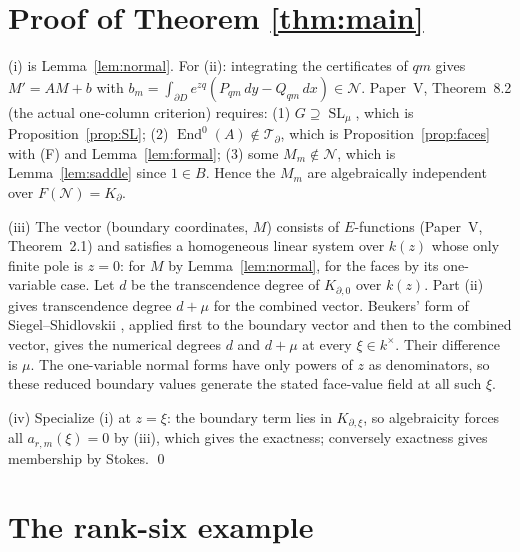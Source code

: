 \documentclass[11pt]{article}
\numberwithin{equation}{section}
\theoremstyle{definition}
\theoremstyle{remark}
\newcommand{\SL}{\operatorname{SL}}\newcommand{\GL}{\operatorname{GL}}\newcommand{\PGL}{\operatorname{PGL}}
\newcommand{\End}{\operatorname{End}}\newcommand{\Hom}{\operatorname{Hom}}\newcommand{\Span}{\operatorname{span}}
\newcommand{\Ncal}{\mathcal N}\newcommand{\Tcal}{\mathcal T}\newcommand{\Bcal}{\mathcal B}
\begin{document}
\section{Proof of Theorem \ref{thm:main}}

(i) is Lemma~\ref{lem:normal}. For (ii): integrating the certificates of
$qm$ gives $M'=AM+b$ with $b_m=\int_{\partial D}e^{zq}(P_{qm}\,dy-Q_{qm}\,dx)\in\Ncal$.
Paper~V, Theorem~8.2 (the actual one-column criterion) requires:
(1) $G\supseteq\SL_\mu$, which is Proposition~\ref{prop:SL};
(2) $\End^0(A)\notin\Tcal_\partial$, which is Proposition~\ref{prop:faces}
with (F) and Lemma~\ref{lem:formal};
(3) some $M_m\notin\Ncal$, which is Lemma~\ref{lem:saddle} since $1\in B$.
Hence the $M_m$ are algebraically independent over $F(\Ncal)=K_\partial$.

(iii) The vector (boundary coordinates, $M$) consists of $E$-functions
(Paper~V, Theorem~2.1) and satisfies a homogeneous linear system over $k(z)$
whose only finite pole is $z=0$: for $M$ by Lemma~\ref{lem:normal}, for the
faces by its one-variable case. Let $d$ be the transcendence degree of
$K_{\partial,0}$ over $k(z)$. Part (ii) gives transcendence degree $d+\mu$
for the combined vector. Beukers' form of Siegel--Shidlovskii
\cite[Theorem~1.1, p.~370]{Beukers}, applied first to the boundary vector
and then to the combined vector, gives the numerical degrees $d$ and
$d+\mu$ at every $\xi\in k^\times$. Their difference is $\mu$.
The one-variable normal forms have only powers of $z$ as denominators, so
these reduced boundary values generate the stated face-value field at
all such $\xi$.

(iv) Specialize (i) at $z=\xi$: the boundary term lies in $K_{\partial,\xi}$,
so algebraicity forces all $a_{r,m}(\xi)=0$ by (iii), which gives the exactness;
conversely exactness gives membership by Stokes. \qed

\section{The rank-six example}\label{sec:example}
\end{document}
